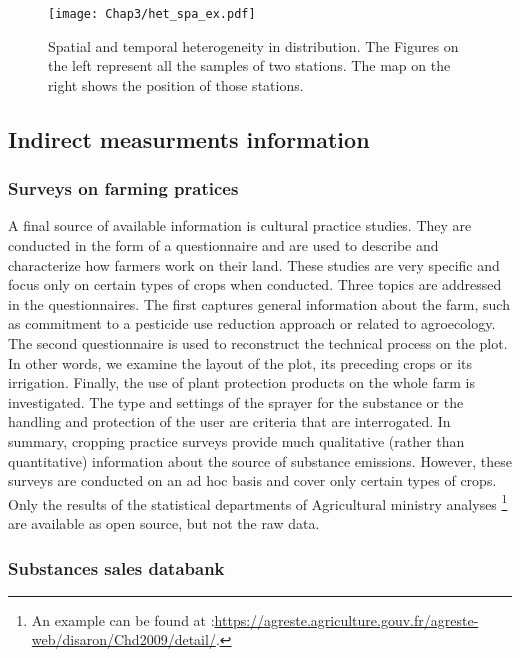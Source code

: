 \begin{figure}[ht]
    \centering
    \texttt{[image: Chap3/het\_spa\_ex.pdf]}
    \caption{Spatial and temporal heterogeneity in distribution. The Figures on the left represent all the samples of two stations. The map on the right shows the position of those stations.}
    \label{fig:het_spa_ex}
\end{figure}



\subsection{Indirect measurments information}

\subsubsection{Surveys on farming pratices}

A final source of available information is cultural practice studies. They are conducted in the form of a questionnaire and are used to describe and characterize how farmers work on their land. These studies are very specific and focus only on certain types of crops when conducted. Three topics are addressed in the questionnaires. The first captures general information about the farm, such as commitment to a pesticide use reduction approach or related to agroecology. The second questionnaire is used to reconstruct the technical process on the plot. In other words, we examine the layout of the plot, its preceding crops or its irrigation. Finally, the use of plant protection products on the whole farm is investigated. The type and settings of the sprayer for the substance or the handling and protection of the user are criteria that are interrogated. In summary, cropping practice surveys provide much qualitative (rather than quantitative) information about the source of substance emissions. However, these surveys are conducted on an ad hoc basis and cover only certain types of crops. Only the results of the statistical departments of Agricultural ministry analyses \footnote{An example can be found at :\url{https://agreste.agriculture.gouv.fr/agreste-web/disaron/Chd2009/detail/}.} are available as open source, but not the raw data.  

\subsubsection{Substances sales databank}

